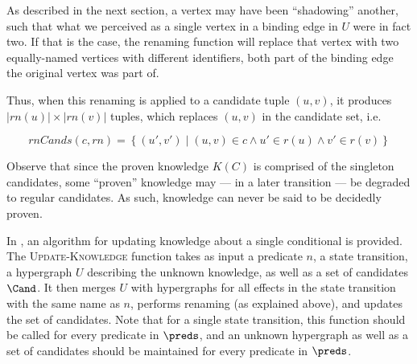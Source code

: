\documentclass[\master/Master.tex]{subfiles}
\begin{document}
As described in the next section, a vertex may have been ``shadowing'' another, such that what we perceived as a single vertex in a binding edge in $U$ were in fact two. If that is the case, the renaming function will replace that vertex with two equally-named vertices with different identifiers, both part of the binding edge the original vertex was part of. 

Thus, when this renaming is applied to a candidate tuple $(u,v)$, it produces $|rn(u)| \times |rn(v)|$ tuples, which replaces $(u,v)$ in the candidate set, i.e.\ 

\begin{equation*}
    rnCands(c, rn) =
    \left\{ 
        \left( u', v' \right) \mid 
        (u, v) \in c \land u' \in r(u) \land v' \in r(v) 
    \right\}
\end{equation*}

Observe that since the proven knowledge $K(C)$ is comprised of the singleton candidates, some ``proven'' knowledge may --- in a later transition --- be degraded to regular candidates. As such, knowledge can never be said to be decidedly proven.

%


In , an algorithm for updating knowledge about a single conditional is provided. The \textsc{Update-Knowledge} function takes as input a predicate $n$, a state transition, a hypergraph $U$ describing the unknown knowledge, as well as a set of candidates $\Cand$. It then merges $U$ with hypergraphs for all effects in the state transition with the same name as $n$, performs renaming (as explained above), and updates the set of candidates. Note that for a single state transition, this function should be called for every predicate in $\preds$, and an unknown hypergraph as well as a set of candidates should be maintained for every predicate in $\preds$.
\end{document}
